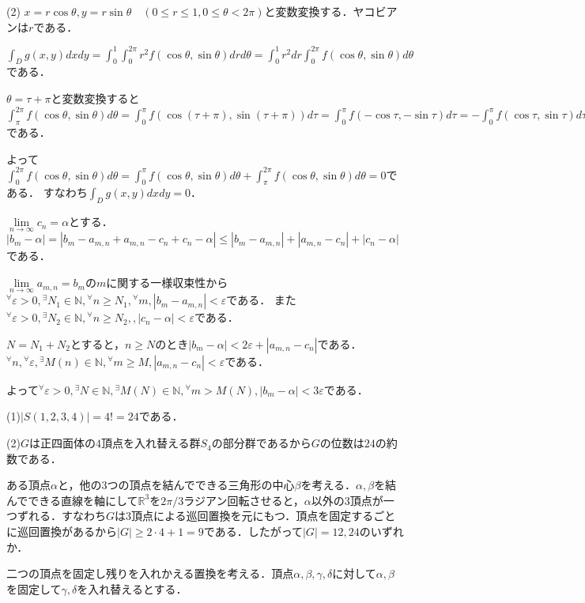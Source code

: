 \documentclass[
		book,
		head_space=20mm,
		foot_space=20mm,
		gutter=10mm,
		line_length=190mm
]{jlreq}
\begin{document}
(2) $x=r\cos\theta,y=r\sin \theta\quad(0\le r \le 1,0\le \theta<2\pi)$と変数変換する．ヤコビアンは$r$である．

$\int_Dg(x,y)dxdy=\int_{0}^1\int_0^{2\pi}r^2f(\cos\theta,\sin\theta)drd\theta=\int_{0}^1r^2dr\int_0^{2\pi}f(\cos \theta,\sin \theta)d\theta$
である．

$\theta=\tau+\pi$と変数変換すると
$\int_{\pi}^{2\pi}f(\cos \theta,\sin \theta)d\theta =\int_0^{\pi}f(\cos (\tau+\pi),\sin (\tau+\pi))d\tau=\int_0^{\pi}f(-\cos \tau,-\sin \tau )d\tau=-\int_0^{\pi}f(\cos \tau,\sin \tau )d\tau$である．

よって$\int_0^{2\pi}f(\cos \theta,\sin \theta)d\theta=\int_0^{\pi}f(\cos \theta,\sin \theta)d\theta+\int_{\pi}^{2\pi}f(\cos \theta,\sin \theta)d\theta=0$である．
すなわち$\int_Dg(x,y)dxdy=0$．

$\lim\limits_{n\to \infty}c_n=\alpha$とする．
$|b_m-\alpha|= |b_m -a_{m,n}+a_{m,n}-c_n+c_n-\alpha|\le |b_m-a_{m,n}|+|a_{m,n}-c_n|+|c_n-\alpha|$である．

$\lim\limits_{n\to\infty}a_{m,n}=b_m$の$m$に関する一様収束性から
${}^\forall \varepsilon >0,{}^\exists N_1\in \mathbb{N},{}^\forall n\ge N_1,{}^\forall m,|b_m-a_{m,n}|<\varepsilon $である．
また${}^\forall \varepsilon >0,{}^\exists N_2\in \mathbb{N},{}^\forall n\ge N_2,,|c_n-\alpha|<\varepsilon $である．

$N=N_1+N_2$とすると，$n\ge N$のとき$|b_m-\alpha|<2\varepsilon+|a_{m,n}-c_n|$である．${}^\forall n,{}^\forall \varepsilon,{}^\exists M(n)\in \mathbb{N},{}^\forall m\ge M,|a_{m,n}-c_n|<\varepsilon$である．

よって${}^\forall\varepsilon>0, {}^\exists N \in \mathbb{N} ,{}^\exists M(N)\in \mathbb{N},{}^\forall m > M(N),|b_m-\alpha|<3\varepsilon$である．

(1)$|S(1,2,3,4)|=4!=24$である．

(2)$G$は正四面体の$4$頂点を入れ替える群$S_4$の部分群であるから$G$の位数は$24$の約数である．

ある頂点$\alpha$と，他の$3$つの頂点を結んでできる三角形の中心$\beta$を考える．$\alpha,\beta$を結んでできる直線を軸にして$\mathbb{R}^3$を$2\pi/3$ラジアン回転させると，$\alpha$以外の3頂点が一つずれる．すなわち$G$は$3$頂点による巡回置換を元にもつ．頂点を固定するごとに巡回置換があるから$|G| \ge 2\cdot 4+1=9$である．したがって$|G|=12,24$のいずれか．

二つの頂点を固定し残りを入れかえる置換を考える．頂点$\alpha,\beta,\gamma,\delta$に対して$\alpha,\beta$を固定して$\gamma,\delta$を入れ替えるとする．
\end{document}
